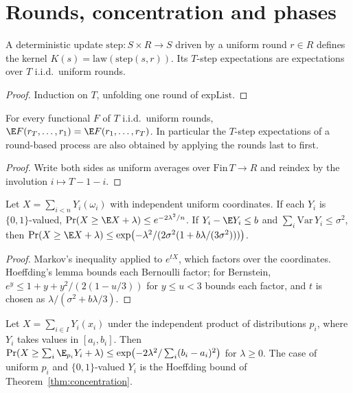 \section{Rounds, concentration and phases}
\begin{definition}\label{def:ofstep}
\leanok{}
A deterministic update $\mathrm{step}\colon S\times R\to S$ driven by a uniform
round $r\in R$ defines the kernel $K(s)=\mathrm{law}(\mathrm{step}(s,r))$. Its
$T$-step expectations are expectations over $T$ i.i.d.\ uniform rounds.
\end{definition}
\begin{proof}\leanok
Induction on $T$, unfolding one round of $\mathrm{expList}$.
\end{proof}
\begin{theorem}\label{thm:reverse}
\leanok{}
For every functional $F$ of $T$ i.i.d.\ uniform rounds,
$\E F(r_T,\dots,r_1)=\E F(r_1,\dots,r_T)$. In particular the $T$-step expectations of a
round-based process are also obtained by applying the rounds last to first.
\end{theorem}
\begin{proof}\leanok
Write both sides as uniform averages over $\mathrm{Fin}\,T\to R$ and reindex by the
involution $i\mapsto T-1-i$.
\end{proof}
\begin{theorem}\label{thm:concentration}
\leanok{}
Let $X=\sum_{i<n}Y_i(\omega_i)$ with independent uniform coordinates. If each
$Y_i$ is $\{0,1\}$-valued, $\Pr(X\ge\E X+\lambda)\le e^{-2\lambda^2/n}$. If
$Y_i-\E Y_i\le b$ and $\sum_i\mathrm{Var}\,Y_i\le\sigma^2$, then
$\Pr(X\ge\E X+\lambda)\le\exp\bigl(-\lambda^2/(2\sigma^2(1+b\lambda/(3\sigma^2)))\bigr)$.
\end{theorem}
\begin{proof}\leanok
Markov's inequality applied to $e^{tX}$, which factors over the coordinates.
Hoeffding's lemma bounds each Bernoulli factor; for Bernstein,
$e^y\le1+y+y^2/(2(1-u/3))$ for $y\le u<3$ bounds each factor, and $t$ is
chosen as $\lambda/(\sigma^2+b\lambda/3)$.
\end{proof}
\begin{theorem}\label{thm:hoeffding-pmf}
\leanok{}
Let $X=\sum_{i\in I}Y_i(x_i)$ under the independent product of distributions $p_i$, where
$Y_i$ takes values in $[a_i,b_i]$. Then
$\Pr(X\ge\sum_i\E_{p_i}Y_i+\lambda)\le\exp\bigl(-2\lambda^2/\sum_i(b_i-a_i)^2\bigr)$ for
$\lambda\ge0$. The case of uniform $p_i$ and $\{0,1\}$-valued $Y_i$ is the Hoeffding bound of
Theorem~\ref{thm:concentration}.
\end{theorem}
